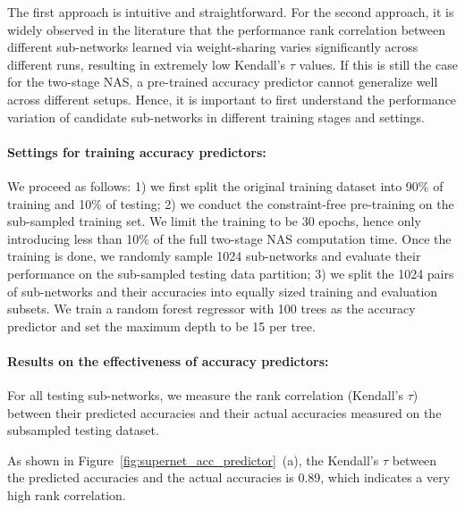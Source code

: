 \documentclass[final]{cvpr}
\theoremstyle{definition}
\begin{document}
The first approach is intuitive and straightforward.
For the second approach, it is widely observed in the literature \cite{yang2019evaluation, chu2019fairnas}
that the performance rank correlation between different sub-networks learned via weight-sharing varies significantly across different runs, 
resulting in extremely low Kendall's $\tau$ values.  
If this is still the case for the two-stage NAS, 
a pre-trained accuracy predictor cannot generalize well across different setups. 
Hence, it is important to first understand the performance variation of candidate sub-networks in different training stages and settings. 



\paragraph{Settings for training accuracy predictors:} 
We proceed as follows: 
1) we first split the original training dataset
into 90\% of training and 10\% of testing; 
2) we conduct the constraint-free pre-training on the sub-sampled training set.
We limit the training to be 30 epochs, 
hence only introducing less than 10\% of the full two-stage NAS computation time.
Once the training is done, we randomly sample 
1024 sub-networks and evaluate their performance on the sub-sampled testing data partition; 
3) we split the 1024 pairs of sub-networks and their accuracies into equally sized training and evaluation subsets. 
We train a random forest regressor with 100 trees as the accuracy predictor and set the maximum depth to be 15 per tree. 



\paragraph{Results on the effectiveness of accuracy predictors:}
For all testing sub-networks, 
we measure the rank correlation (Kendall's $\tau$) 
between their predicted accuracies 
and their actual accuracies measured on the subsampled testing dataset. 

As shown in Figure~\ref{fig:supernet_acc_predictor}~(a), 
the Kendall's $\tau$ between the predicted accuracies and the actual accuracies is 0.89, which indicates a very high rank correlation.
\end{document}
